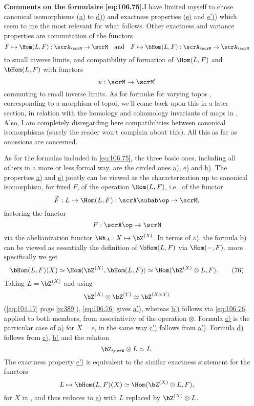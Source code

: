 \textbf{Comments on the formulaire \eqref{eq:106.75}.}\enspace I have
limited myself to chose canonical isomorphisms
(\hyperref[eq:106.75]{a)} to \hyperref[eq:106.75]{d)}) and exactness
properties (\hyperref[eq:106.75]{e)} and \hyperref[eq:106.75]{e')})
which seem to me the most relevant for what follows. Other exactness
and variance properties are commutation of the functors
\[F\mapsto\Hom(L,F):\scrA_\scrM\to\scrM\quad\text{and}\quad
F\mapsto\bHom(L,F):\scrA_\scrM\to\scrA_\scrM\]
to small inverse limits, and compatibility of formation of $\Hom(L,F)$
and $\bHom(L,F)$ with functors
\[u:\scrM\to\scrM'\]
commuting to small inverse limits. As for formulæ for varying topos
\scrA, corresponding to a morphism of topoi, we'll come back upon this
in a later section, in relation with the homology and cohomology
invariants of maps in \Cat. Also, I am completely disregarding here
compatibilities between canonical isomorphisms (surely the reader
won't complain about this). All this as far as omissions are
concerned.

As for the formulas included in \eqref{eq:106.75}, the
three basic ones, including all others in a more or less formal way,
are the circled ones \hyperref[eq:106.75]{a)},
\hyperref[eq:106.75]{e)} and \hyperref[eq:106.75]{b)}. The properties
\hyperref[eq:106.75]{a)} and \hyperref[eq:106.75]{e)} jointly can be
viewed as the characterization up to canonical isomorphism, for fixed
$F$, of the operation $\Hom(L,F)$, i.e., of the functor
\[\widetilde F: L\mapsto\Hom(L,F): {\scrA\subab}\op\to\scrM,\]
factoring the functor
\[F:\scrA\op\to\scrM\]
via the abelianization functor $\Wh_A:X\mapsto \bZ^{(X)}$. In terms of
a), the formula b) can be viewed as essentially the definition of
$\bHom(L,F)$ via $\Hom({-},F)$, more specifically we get
\begin{equation}
  \label{eq:106.76}
  \bHom(L,F)(X) \simeq \Hom(\bZ^{(X)},\bHom(L,F)) \simeq
  \Hom(\bZ^{(X)}\otimes L, F).\tag{76}
\end{equation}
Taking $L=\bZ^{(X)}$ and using
\[\bZ^{(X)}\otimes \bZ^{(Y)} \simeq\bZ^{(X\times Y)}\]
(\eqref{eq:104.17} page \ref{p:389}), \eqref{eq:106.76} gives
\hyperref[eq:106.75]{a')}, whereas \hyperref[eq:106.75]{b')} follows
via \eqref{eq:106.76} applied to both members, from associativity of the
operation $\otimes$. Formula \hyperref[eq:106.75]{c)} is the
particular case of \hyperref[eq:106.75]{a)} for $X=e$, in the same way
\hyperref[eq:106.75]{c')} follows from
\hyperref[eq:106.75]{a')}. Formula \hyperref[eq:106.75]{d)} follows
from \hyperref[eq:106.75]{c)}, \hyperref[eq:106.75]{b)} and the
relation
\[\bZ_\scrA\otimes L\simeq L.\]
The exactness property \hyperref[eq:106.75]{e')} is equivalent to the
similar exactness statement for the functors
\[L\mapsto\bHom(L,F)(X)\simeq\Hom(\bZ^{(X)}\otimes L,F),\]
for $X$ in \scrA, and thus reduces to \hyperref[eq:106.75]{e)} with
$L$ replaced by $\bZ^{(X)}\otimes L$.


